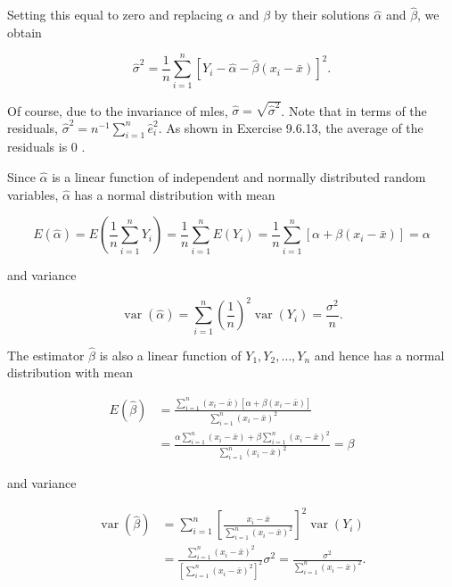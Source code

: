 Setting this equal to zero and replacing $\alpha$ and $\beta$ by their solutions $\hat{\alpha}$ and $\hat{\beta}$, we obtain


\begin{equation*}
\hat{\sigma}^{2}=\frac{1}{n} \sum_{i=1}^{n}\left[Y_{i}-\hat{\alpha}-\hat{\beta}\left(x_{i}-\bar{x}\right)\right]^{2} . \tag{9.6.8}
\end{equation*}


Of course, due to the invariance of mles, $\hat{\sigma}=\sqrt{\hat{\sigma}^{2}}$. Note that in terms of the residuals, $\hat{\sigma}^{2}=n^{-1} \sum_{i=1}^{n} \hat{e}_{i}^{2}$. As shown in Exercise 9.6.13, the average of the residuals is 0 .

Since $\hat{\alpha}$ is a linear function of independent and normally distributed random variables, $\hat{\alpha}$ has a normal distribution with mean

$$
E(\hat{\alpha})=E\left(\frac{1}{n} \sum_{i=1}^{n} Y_{i}\right)=\frac{1}{n} \sum_{i=1}^{n} E\left(Y_{i}\right)=\frac{1}{n} \sum_{i=1}^{n}\left[\alpha+\beta\left(x_{i}-\bar{x}\right)\right]=\alpha
$$

and variance

$$
\operatorname{var}(\hat{\alpha})=\sum_{i=1}^{n}\left(\frac{1}{n}\right)^{2} \operatorname{var}\left(Y_{i}\right)=\frac{\sigma^{2}}{n} .
$$

The estimator $\hat{\beta}$ is also a linear function of $Y_{1}, Y_{2}, \ldots, Y_{n}$ and hence has a normal distribution with mean

$$
\begin{aligned}
E(\hat{\beta}) & =\frac{\sum_{i=1}^{n}\left(x_{i}-\bar{x}\right)\left[\alpha+\beta\left(x_{i}-\bar{x}\right)\right]}{\sum_{i=1}^{n}\left(x_{i}-\bar{x}\right)^{2}} \\
& =\frac{\alpha \sum_{i=1}^{n}\left(x_{i}-\bar{x}\right)+\beta \sum_{i=1}^{n}\left(x_{i}-\bar{x}\right)^{2}}{\sum_{i=1}^{n}\left(x_{i}-\bar{x}\right)^{2}}=\beta
\end{aligned}
$$

and variance

$$
\begin{aligned}
\operatorname{var}(\hat{\beta}) & =\sum_{i=1}^{n}\left[\frac{x_{i}-\bar{x}}{\sum_{i=1}^{n}\left(x_{i}-\bar{x}\right)^{2}}\right]^{2} \operatorname{var}\left(Y_{i}\right) \\
& =\frac{\sum_{i=1}^{n}\left(x_{i}-\bar{x}\right)^{2}}{\left[\sum_{i=1}^{n}\left(x_{i}-\bar{x}\right)^{2}\right]^{2}} \sigma^{2}=\frac{\sigma^{2}}{\sum_{i=1}^{n}\left(x_{i}-\bar{x}\right)^{2}} .
\end{aligned}
$$

